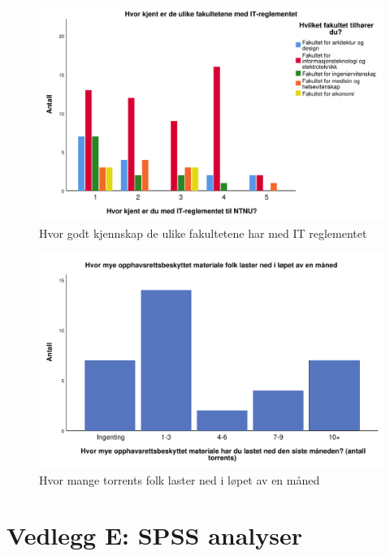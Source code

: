 \begin{figure}[H]
    \centering
    \includegraphics[scale=0.45]{case_1/bilder/reglement_fakultet.pdf}
    \caption[reglement-fakultet]{Hvor godt kjennskap de ulike fakultetene har med IT reglementet}
    \label{fig:reglement-fakultet}
\end{figure}

\begin{figure}[H]
    \centering
    \includegraphics[scale=0.45]{case_1/bilder/antalltorrents.pdf}
    \caption[antalltorrents]{Hvor mange torrents folk laster ned i løpet av en måned}
    \label{fig:antalltorrents}
\end{figure}

\chapter*{Vedlegg E: SPSS analyser}
\label{vedlegg:ANOVA}

